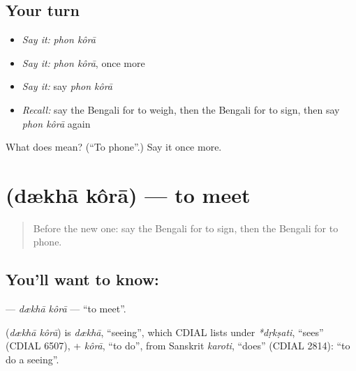 \subsection*{Your turn}
\begin{itemize}
\raggedright
  \item \emph{Say it:} \emph{phon kôrā}
  \item \emph{Say it:} \emph{phon kôrā}, once more
  \item \emph{Say it:} say \emph{phon kôrā}
  \item \emph{Recall:} say the Bengali for to weigh, then the Bengali for to sign, then say \emph{phon kôrā} again
\end{itemize}

\begin{tcolorbox}[breakable,colback=teal!4,colframe=teal!35!black,title={Before you move on}]
What does   mean? (\textquotedblleft{}To phone\textquotedblright{}.) Say it once more.
\end{tcolorbox}
\section[\texorpdfstring{\bn{দেখা} \bn{করা} (dækhā kôrā)}{দেখা করা (dækhā kôrā)}]{  (dækhā kôrā) — to meet}

\label{lesson:BN-C210-dkha-kora}



\begin{quote}
Before the new one: say the Bengali for to sign, then the Bengali for to phone.
\end{quote}

\subsection*{You'll want to know:  }
\textbf{ } — \emph{dækhā kôrā} — \textquotedblleft{}to meet\textquotedblright{}.

\begin{cousinweb}
\textbf{ } (\emph{dækhā kôrā}) is \emph{dækhā}, \textquotedblleft{}seeing\textquotedblright{}, which CDIAL lists under \emph{*dṛkṣati}, \textquotedblleft{}sees\textquotedblright{} (CDIAL 6507), + \emph{kôrā}, \textquotedblleft{}to do\textquotedblright{}, from Sanskrit \emph{karoti}, \textquotedblleft{}does\textquotedblright{} (CDIAL 2814): \textquotedblleft{}to do a seeing\textquotedblright{}.
\end{cousinweb}

